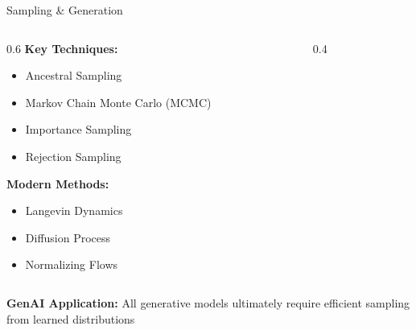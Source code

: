 \documentclass[5pt,aspectratio=169]{beamer}
\begin{document}
\begin{frame}{Sampling \& Generation}
\begin{columns}[T]
\begin{column}{0.6\textwidth}
\textbf{Key Techniques:}
\begin{itemize}
\item Ancestral Sampling
\item Markov Chain Monte Carlo (MCMC)
\item Importance Sampling
\item Rejection Sampling
\end{itemize}

\textbf{Modern Methods:}
\begin{itemize}
\item Langevin Dynamics
\item Diffusion Process
\item Normalizing Flows
\end{itemize}
\end{column}

\begin{column}{0.4\textwidth}
\end{column}
\end{columns}

\vspace{0.5cm}
\textbf{GenAI Application:} All generative models ultimately require efficient sampling from learned distributions
\end{frame}
\end{document}
